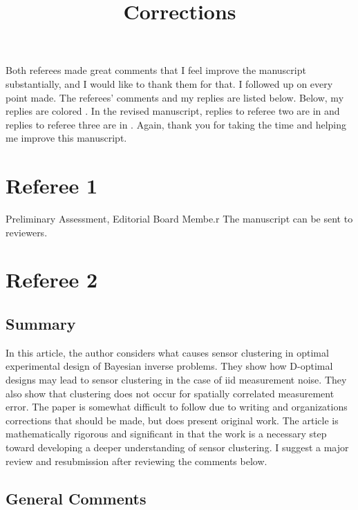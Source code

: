 \documentclass{amsart}
\title{Corrections}
\begin{document}
\maketitle

Both referees made great comments that I feel improve the manuscript
substantially, and I would like to thank them for that. I followed up
on every point made. The referees' comments and my replies are listed
below. Below, my replies are colored . In the revised
manuscript, replies to referee two are in  and replies
to referee three are in . Again, thank you for taking
the time and helping me improve this manuscript.

\section{Referee 1}
Preliminary Assessment, Editorial Board Membe.r The manuscript can be
sent to reviewers.


\section{Referee 2}
\subsection{Summary}
In this article, the author considers what causes sensor clustering in
optimal experimental design of Bayesian inverse problems. They show
how D-optimal designs may lead to sensor clustering in the case of iid
measurement noise. They also show that clustering does not occur for
spatially correlated measurement error. The paper is somewhat
difficult to follow due to writing and organizations corrections that
should be made, but does present original work. The article is
mathematically rigorous and significant in that the work is a
necessary step toward developing a deeper understanding of sensor
clustering. I suggest a major review and resubmission after reviewing
the comments below.


\subsection{General Comments}
\end{document}
